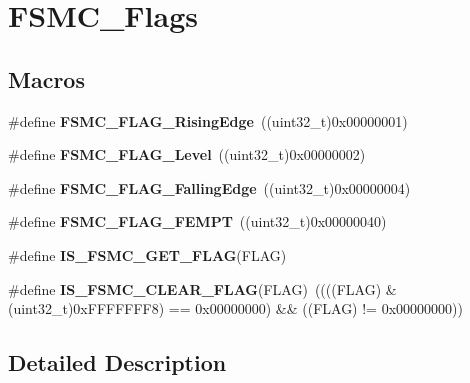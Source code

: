 \hypertarget{group___f_s_m_c___flags}{}\section{F\+S\+M\+C\+\_\+\+Flags}
\label{group___f_s_m_c___flags}
\subsection*{Macros}
\begin{DoxyCompactItemize}
\item 
\hypertarget{group___f_s_m_c___flags_ga5aadbd5d9f1b6a25bcc1fc6f3bf4c9cc}{}\#define {\bfseries F\+S\+M\+C\+\_\+\+F\+L\+A\+G\+\_\+\+Rising\+Edge}~((uint32\+\_\+t)0x00000001)\label{group___f_s_m_c___flags_ga5aadbd5d9f1b6a25bcc1fc6f3bf4c9cc}

\item 
\hypertarget{group___f_s_m_c___flags_ga25868d35780998a52190c424ebb3823f}{}\#define {\bfseries F\+S\+M\+C\+\_\+\+F\+L\+A\+G\+\_\+\+Level}~((uint32\+\_\+t)0x00000002)\label{group___f_s_m_c___flags_ga25868d35780998a52190c424ebb3823f}

\item 
\hypertarget{group___f_s_m_c___flags_gaaaa85bce06ed962874686ad7af0f0cb7}{}\#define {\bfseries F\+S\+M\+C\+\_\+\+F\+L\+A\+G\+\_\+\+Falling\+Edge}~((uint32\+\_\+t)0x00000004)\label{group___f_s_m_c___flags_gaaaa85bce06ed962874686ad7af0f0cb7}

\item 
\hypertarget{group___f_s_m_c___flags_ga8da2bd0b9d11877aaebaba0c77e8b0cc}{}\#define {\bfseries F\+S\+M\+C\+\_\+\+F\+L\+A\+G\+\_\+\+F\+E\+M\+P\+T}~((uint32\+\_\+t)0x00000040)\label{group___f_s_m_c___flags_ga8da2bd0b9d11877aaebaba0c77e8b0cc}

\item 
\#define {\bfseries I\+S\+\_\+\+F\+S\+M\+C\+\_\+\+G\+E\+T\+\_\+\+F\+L\+A\+G}(F\+L\+A\+G)
\item 
\hypertarget{group___f_s_m_c___flags_ga1114bf56b54e726831b38fc8c5daa14e}{}\#define {\bfseries I\+S\+\_\+\+F\+S\+M\+C\+\_\+\+C\+L\+E\+A\+R\+\_\+\+F\+L\+A\+G}(F\+L\+A\+G)~((((F\+L\+A\+G) \& (uint32\+\_\+t)0x\+F\+F\+F\+F\+F\+F\+F8) == 0x00000000) \&\& ((\+F\+L\+A\+G) != 0x00000000))\label{group___f_s_m_c___flags_ga1114bf56b54e726831b38fc8c5daa14e}

\end{DoxyCompactItemize}


\subsection{Detailed Description}


